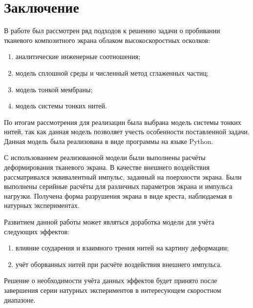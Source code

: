 \section{Заключение}\label{ch:conclusion}

В работе был рассмотрен ряд подходов к решению задачи о пробивании тканевого композитного экрана облаком высокоскоростных осколков:
\begin{enumerate}
    \item аналитические инженерные соотношения;
    \item модель сплошной среды и численный метод сглаженных частиц;
    \item модель тонкой мембраны;
    \item модель системы тонких нитей.
\end{enumerate}

По итогам рассмотрения для реализации была выбрана модель системы тонких нитей,
так как данная модель позволяет учесть особенности поставленной задачи.
Данная модель была реализована в виде программы на языке Python.

С использованием реализованной модели были выполнены расчёты деформирования тканевого экрана.
В качестве внешнего воздействия рассматривался эквивалентный импульс, заданный на поерхности экрана.
Были выполнены серийные расчёты для различных параметров экрана и импульса нагрузки.
Получена форма разрушения экрана в виде креста, наблюдаемая в натурных экспериментах.

Развитием данной работы может являться доработка модели для учёта следующих эффектов:
\begin{enumerate}
    \item влияние соударения и взаимного трения нитей на картину деформации;
    \item учёт оборванных нитей при расчёте воздействия внешнего импульса.
\end{enumerate}

Решение о необходимости учёта данных эффектов будет принято после завершения серии
натурных экспериментов в интересующем скоростном диапазоне.